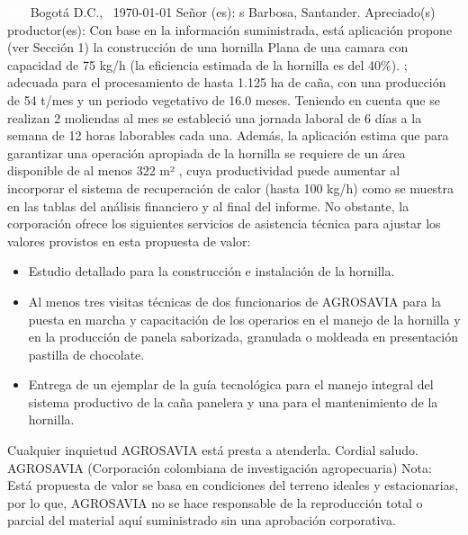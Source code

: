 \documentclass{article}%
\begin{document}
\begin{large}%
\textcolor{white}{%
HH%
}%
\linebreak%
Bogotá D.C., %
\ {\today}%
\newline%
 \newline%
%
\linebreak%
\newline%
Señor (es):%
\newline%
s%
\newline%
Barbosa, Santander.%
\newline%
 \newline%
%
\newline%
Apreciado(s) productor(es):%
\newline%
 \newline%
%
Con base en la información suministrada, está aplicación propone (ver Sección 1) la construcción de una hornilla Plana de una camara con capacidad de 75 kg/h (la eficiencia estimada de la hornilla es del 40\%). ; adecuada para el procesamiento de hasta 1.125 ha de caña, con una producción de 54 t/mes y un periodo vegetativo de 16.0 meses. Teniendo en cuenta que se realizan 2 moliendas al mes se estableció una jornada laboral de 6 días a la semana de 12 horas laborables cada una.\newline%
 Además, la aplicación estima que para garantizar una operación apropiada de la hornilla  se requiere de un área disponible de al menos 322 m²%
, cuya productividad puede aumentar al incorporar el sistema de recuperación de calor (hasta 100 kg/h) como se muestra en las tablas del análisis financiero y al final del informe. No obstante, la corporación ofrece los siguientes servicios de asistencia técnica para ajustar los valores provistos en esta propuesta de valor:%
\begin{itemize}%
\item%
Estudio detallado para la construcción e instalación de la hornilla.%
\item%
Al menos tres visitas técnicas de dos funcionarios de AGROSAVIA para la puesta en marcha y capacitación de los operarios en el manejo de la hornilla y en la producción de panela saborizada, granulada o moldeada en presentación pastilla de chocolate.%
\item%
Entrega de un ejemplar de la guía tecnológica para el manejo integral del sistema productivo de la caña panelera y una para el mantenimiento de la hornilla.%
\end{itemize}%
Cualquier inquietud AGROSAVIA está presta a atenderla.\newline%
Cordial saludo.\newline%
\newline%
 \newline%
 \newline%
AGROSAVIA (Corporación colombiana de investigación agropecuaria)%
\newline%
 \newline%
 Nota: Está propuesta de valor se basa en condiciones del terreno ideales y estacionarias, por lo que, AGROSAVIA no se hace responsable de la reproducción total o parcial del material aquí suministrado sin una aprobación corporativa.%
\end{large}%
\end{document}

